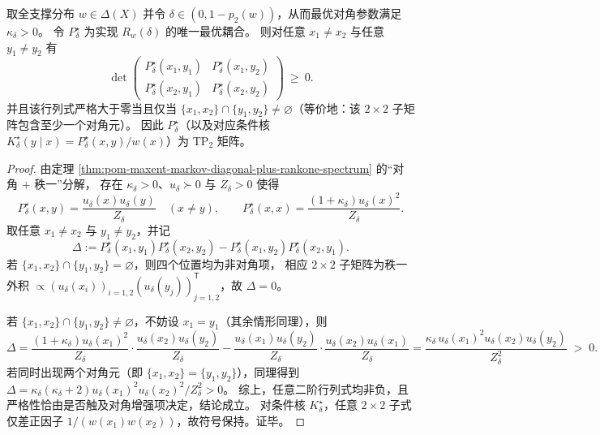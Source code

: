 \begin{theorem}\label{thm:pom-diagonal-rate-optimal-tp2}
取全支撑分布 \(w\in\Delta(X)\) 并令 \(\delta\in(0,1-p_2(w))\)，从而最优对角参数满足 \(\kappa_\delta>0\)。
令 \(P^\star_\delta\) 为实现 \(R_w(\delta)\) 的唯一最优耦合。
则对任意 \(x_1\ne x_2\) 与任意 \(y_1\ne y_2\) 有
\[
\det\!\begin{pmatrix}
P^\star_\delta(x_1,y_1) & P^\star_\delta(x_1,y_2)\\
P^\star_\delta(x_2,y_1) & P^\star_\delta(x_2,y_2)
\end{pmatrix}\ \ge\ 0.
\]
并且该行列式严格大于零当且仅当 \(\{x_1,x_2\}\cap\{y_1,y_2\}\ne\varnothing\)（等价地：该 \(2\times2\) 子矩阵包含至少一个对角元）。
因此 \(P^\star_\delta\)（以及对应条件核 \(K^\star_\delta(y\mid x)=P^\star_\delta(x,y)/w(x)\)）为 \(\mathrm{TP}_2\) 矩阵。
\end{theorem}
\begin{proof}
由定理 \ref{thm:pom-maxent-markov-diagonal-plus-rankone-spectrum} 的“对角 \(+\) 秩一”分解，
存在 \(\kappa_\delta>0\)、\(u_\delta\succ0\) 与 \(Z_\delta>0\) 使得
\[
P^\star_\delta(x,y)=\frac{u_\delta(x)u_\delta(y)}{Z_\delta}\quad(x\ne y),
\qquad
P^\star_\delta(x,x)=\frac{(1+\kappa_\delta)u_\delta(x)^2}{Z_\delta}.
\]
取任意 \(x_1\ne x_2\) 与 \(y_1\ne y_2\)，并记
\[
\Delta:=
P^\star_\delta(x_1,y_1)P^\star_\delta(x_2,y_2)-P^\star_\delta(x_1,y_2)P^\star_\delta(x_2,y_1).
\]
若 \(\{x_1,x_2\}\cap\{y_1,y_2\}=\varnothing\)，则四个位置均为非对角项，
相应 \(2\times2\) 子矩阵为秩一外积 \(\propto (u_\delta(x_i))_{i=1,2}(u_\delta(y_j))_{j=1,2}^{\mathsf T}\)，故 \(\Delta=0\)。
\par
若 \(\{x_1,x_2\}\cap\{y_1,y_2\}\ne\varnothing\)，不妨设 \(x_1=y_1\)（其余情形同理），则
\[
\Delta
=\frac{(1+\kappa_\delta)u_\delta(x_1)^2}{Z_\delta}\cdot\frac{u_\delta(x_2)u_\delta(y_2)}{Z_\delta}
-\frac{u_\delta(x_1)u_\delta(y_2)}{Z_\delta}\cdot\frac{u_\delta(x_2)u_\delta(x_1)}{Z_\delta}
=\frac{\kappa_\delta\,u_\delta(x_1)^2u_\delta(x_2)u_\delta(y_2)}{Z_\delta^2}\;>\;0.
\]
若同时出现两个对角元（即 \(\{x_1,x_2\}=\{y_1,y_2\}\)），同理得到
\(
\Delta=\kappa_\delta(\kappa_\delta+2)u_\delta(x_1)^2u_\delta(x_2)^2/Z_\delta^2>0
\)。
综上，任意二阶行列式均非负，且严格性恰由是否触及对角增强项决定，结论成立。
对条件核 \(K^\star_\delta\)，任意 \(2\times2\) 子式仅差正因子 \(1/(w(x_1)w(x_2))\)，故符号保持。证毕。
\end{proof}

\endinput

